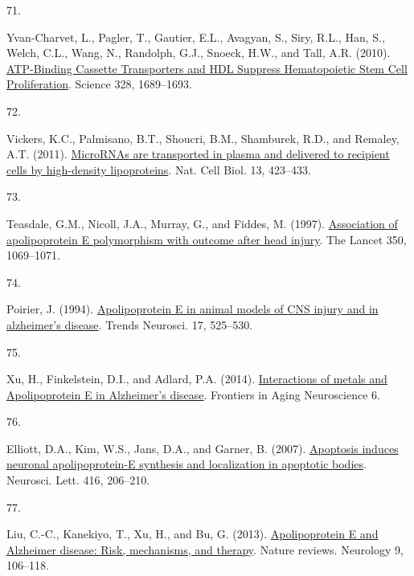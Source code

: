 \documentclass[
]{article}
\newlength{\cslhangindent}
\newlength{\csllabelwidth}
\newlength{\cslentryspacingunit} %
\newenvironment{CSLReferences}[2] %
 {%
  \setlength{\parindent}{0pt}
  \ifodd #1
  \let\oldpar\par
  \def\par{\hangindent=\cslhangindent\oldpar}
  \fi
  \setlength{\parskip}{#2\cslentryspacingunit}
 }%
 {}
\newcommand{\CSLLeftMargin}[1]{\parbox[t]{\csllabelwidth}{#1}}
\newcommand{\CSLRightInline}[1]{\parbox[t]{\linewidth - \csllabelwidth}{#1}\break}
\begin{document}
\begin{CSLReferences}{0}{0}
\leavevmode{}%
\CSLLeftMargin{71. }
\CSLRightInline{Yvan-Charvet, L., Pagler, T., Gautier, E.L., Avagyan, S., Siry, R.L., Han, S., Welch, C.L., Wang, N., Randolph, G.J., Snoeck, H.W., and Tall, A.R. (2010). \href{https://doi.org/10.1126/science.1189731}{{ATP-Binding Cassette Transporters} and {HDL Suppress Hematopoietic Stem Cell Proliferation}}. Science 328, 1689--1693.}

\leavevmode{}%
\CSLLeftMargin{72. }
\CSLRightInline{Vickers, K.C., Palmisano, B.T., Shoucri, B.M., Shamburek, R.D., and Remaley, A.T. (2011). \href{https://doi.org/10.1038/ncb2210}{{MicroRNAs} are transported in plasma and delivered to recipient cells by high-density lipoproteins}. Nat. Cell Biol. 13, 423--433.}

\leavevmode{}%
\CSLLeftMargin{73. }
\CSLRightInline{Teasdale, G.M., Nicoll, J.A., Murray, G., and Fiddes, M. (1997). \href{https://doi.org/10.1016/S0140-6736(97)04318-3}{Association of apolipoprotein {E} polymorphism with outcome after head injury}. The Lancet 350, 1069--1071.}

\leavevmode{}%
\CSLLeftMargin{74. }
\CSLRightInline{Poirier, J. (1994). \href{https://doi.org/10.1016/0166-2236(94)90156-2}{Apolipoprotein {E} in animal models of {CNS} injury and in alzheimer's disease}. Trends Neurosci. 17, 525--530.}

\leavevmode{}%
\CSLLeftMargin{75. }
\CSLRightInline{Xu, H., Finkelstein, D.I., and Adlard, P.A. (2014). \href{https://doi.org/10.3389/fnagi.2014.00121}{Interactions of metals and {Apolipoprotein E} in {Alzheimer}'s disease}. Frontiers in Aging Neuroscience 6.}

\leavevmode{}%
\CSLLeftMargin{76. }
\CSLRightInline{Elliott, D.A., Kim, W.S., Jans, D.A., and Garner, B. (2007). \href{https://doi.org/10.1016/j.neulet.2007.02.014}{Apoptosis induces neuronal apolipoprotein-{E} synthesis and localization in apoptotic bodies}. Neurosci. Lett. 416, 206--210.}

\leavevmode{}%
\CSLLeftMargin{77. }
\CSLRightInline{Liu, C.-C., Kanekiyo, T., Xu, H., and Bu, G. (2013). \href{https://doi.org/10.1038/nrneurol.2012.263}{Apolipoprotein {E} and {Alzheimer} disease: Risk, mechanisms, and therapy}. Nature reviews. Neurology 9, 106--118.}


\end{CSLReferences}
\end{document}
